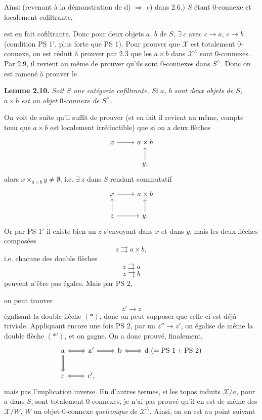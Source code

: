 \documentclass[11pt]{article}
\newcommand{\printedpage}[1]{\marginpar{\footnotesize p.~#1}}
\newcommand{\msp}[1]{\marginpar{\footnotesize [#1]}}
\newcommand{\X}{\mathscr{X}}
\begin{document}
Ainsi (revenant à la démonstration de d) $\Longrightarrow$ c) dans 2.6.) $S$ étant 0-connexe et localement cofiltrante,

\msp{page 26} est en fait cofiltrante. Donc pour deux objets $a$, $b$ de $S$, $\exists\ c$ avec $c\longrightarrow a$, $c\longrightarrow b$ (condition PS 1$'$, plus forte que PS 1). Pour prouver que $\X$ est totalement 0-connexe, on est réduit à prouver par 2.3 que les $a\times b$ dans $\X^\wedge$ sont 0-connexes. Par 2.9, il revient au même de prouver qu'ils sont 0-connexes dans $S^\wedge$. Donc on est ramené à prouver le

\textbf{Lemme 2.10.} \textit{Soit $S$ une catégorie cofiltrante. Si $a$, $b$ sont deux objets de $S$, $a\times b$ est un objet} $0$\textit{-connexe de $S^\wedge$.}

On voit de suite qu'il suffit de prouver (et en fait il revient au même, compte tenu que $a\times b$ est localement irréductible) que si on a deux flèches
\[
\begin{tikzcd}
x \arrow[r] & a\times b \\
 & y, \arrow[u]
\end{tikzcd}
\]
alors $x\times_{a\times b}y\neq\emptyset$, i.e. $\exists\ z$ dans $S$ rendant commutatif
\[
\begin{tikzcd}
x \arrow[r] & a\times b \\
z \arrow[u] \arrow[r] & y. \arrow[u]
\end{tikzcd}
\]
Or par PS 1$'$ il existe bien un $z$ s'envoyant dans $x$ et dans $y$, mais les deux flèches composées
\[
z\rightrightarrows a\times b,
\]
i.e. chacune des double flèches
\[
z\rightrightarrows a \tag*{$(*)$}
\]
\[
z\rightrightarrows b \tag*{$(*')$}
\]
peuvent n'être pas égales. Mais par PS 2,

\msp{page 27}on peut trouver
\[
z'\longrightarrow z
\]
\printedpage{17}
égalisant la double flèche $(*)$, donc on peut supposer que celle-ci est déjà triviale. Appliquant encore une fois PS 2, par un $z''\longrightarrow z'$, on égalise de même la double flèche $(*')$, et on gagne. On a donc prouvé, finalement,
\[
\begin{tikzcd}
\mathrm{a} \arrow[r, Leftrightarrow] \arrow[d, Rightarrow] & \mathrm{a}' \arrow[r, Rightarrow] & \mathrm{b} \arrow[r, Leftrightarrow] & \mathrm{d}\ (=\mathrm{PS}\ 1+\mathrm{PS}\ 2) \\
\mathrm{c} \arrow[r, Leftrightarrow] & \mathrm{c}',
\end{tikzcd}
\]
mais pas l'implication inverse. En d'autres termes, si les topos induits $\X/a$, pour $a$ dans $S$, sont totalement 0-connexes, je n'ai pas prouvé qu'il en est de même des $\X/W$, $W$ un objet 0-connexe \textit{quelconque} de $\X^\wedge$. Ainsi, on en est au point suivant
\end{document}
